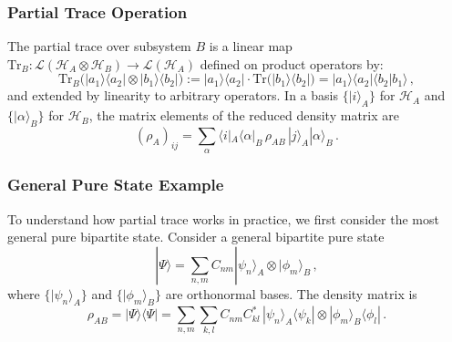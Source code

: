 \documentclass[12pt,oneside,openright]{report}
\theoremstyle{definition}
\theoremstyle{plain}
\theoremstyle{remark}
\begin{document}
\subsubsection{Partial Trace Operation}
The partial trace over subsystem $B$ is a linear map $\text{Tr}_B: \mathcal{L}(\mathcal{H}_A \otimes \mathcal{H}_B) \to \mathcal{L}(\mathcal{H}_A)$ 
defined on product operators by:
\begin{equation}
\text{Tr}_B\big(|a_1\rangle\langle a_2| \otimes |b_1\rangle\langle b_2|\big) := |a_1\rangle\langle a_2| \cdot \text{Tr}\big(|b_1\rangle\langle b_2|\big) = |a_1\rangle\langle a_2| \langle b_2 | b_1 \rangle\,,
\label{eq:partial_trace_def}
\end{equation}
and extended by linearity to arbitrary operators. In a basis $\{|i\rangle_A\}$ for $\mathcal{H}_A$ and $\{|\alpha\rangle_B\}$ for $\mathcal{H}_B$, the matrix elements of the reduced density matrix are
\begin{equation}
(\rho_A)_{ij} = \sum_{\alpha} \langle i|_A \langle\alpha|_B \, \rho_{AB} \, |j\rangle_A |\alpha\rangle_B\,.
\end{equation}
\subsubsection{General Pure State Example}
To understand how partial trace works in practice, we first consider the most general pure bipartite state.
Consider a general bipartite pure state
\begin{equation}
|\Psi\rangle = \sum_{n,m} C_{nm} |\psi_n\rangle_A \otimes |\phi_m\rangle_B\,,
\label{eq:general_pure_state}
\end{equation}
where $\{|\psi_n\rangle_A\}$ and $\{|\phi_m\rangle_B\}$ are orthonormal bases. The density matrix is
\begin{equation}
\rho_{AB} = |\Psi\rangle\langle\Psi| = \sum_{n,m}\sum_{k,l} C_{nm} C_{kl}^{*} \, |\psi_n\rangle_A\langle\psi_k| \otimes |\phi_m\rangle_B\langle\phi_l|\,.
\label{eq:pure_state_density}
\end{equation}
\end{document}
